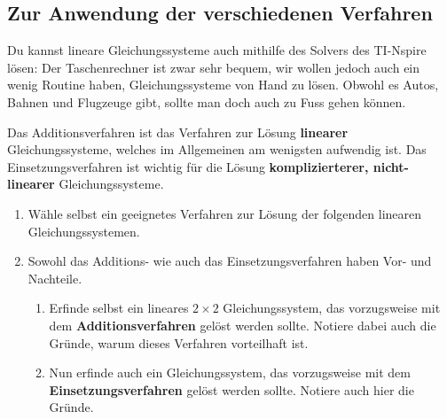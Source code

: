 \documentclass[11pt,oneside]{article}
\begin{document}
\subsection{Zur Anwendung der verschiedenen Verfahren}
	Du kannst lineare Gleichungssysteme auch mithilfe des Solvers des TI-Nspire lösen:\vspace{16pt}\newline
	Der Taschenrechner ist zwar sehr bequem, wir wollen jedoch auch ein wenig Routine haben, Gleichungssysteme von Hand zu lösen. Obwohl es Autos, Bahnen und Flugzeuge gibt, sollte man doch auch zu Fuss gehen können.
	\begin{satz}
		Das Additionsverfahren ist das Verfahren zur Lösung \textbf{linearer} Gleichungssysteme, welches im Allgemeinen am wenigsten aufwendig ist.\vspace*{11pt}\newline
		Das Einsetzungsverfahren ist wichtig für die Lösung \textbf{komplizierterer, nicht-linearer} Gleichungssysteme.
	\end{satz}
	\begin{aufgabe}
		\begin{enumerate}
			\item Wähle selbst ein geeignetes Verfahren zur Lösung der folgenden linearen Gleichungssystemen.
			\item Sowohl das Additions- wie auch das Einsetzungsverfahren haben Vor- und Nachteile.
			\begin{enumerate}[label=\alph*)]
				\item Erfinde selbst ein lineares $2\times2$ Gleichungssystem, das vorzugsweise mit dem \textbf{Additionsverfahren} gelöst werden sollte. Notiere dabei auch die Gründe, warum dieses Verfahren vorteilhaft ist.
				\item Nun erfinde auch ein Gleichungssystem, das vorzugsweise mit dem \textbf{Einsetzungsverfahren} gelöst werden sollte. Notiere auch hier die Gründe.
			\end{enumerate}
		\end{enumerate}
	\end{aufgabe}
	\newpage
\end{document}

